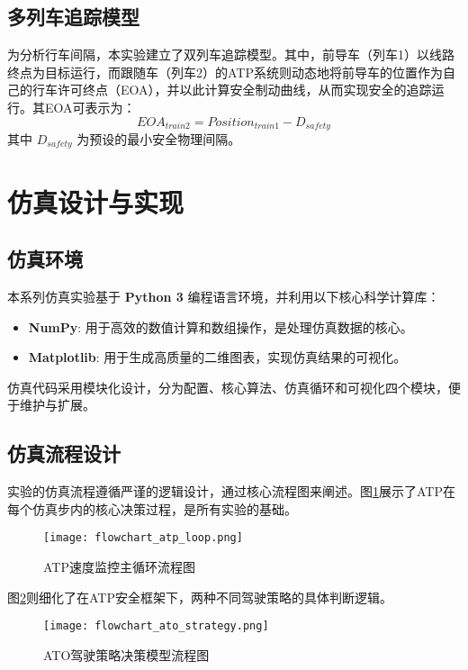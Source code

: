 \documentclass[11pt, a4paper]{ctexart}
\begin{document}
\subsection{多列车追踪模型}
为分析行车间隔，本实验建立了双列车追踪模型。其中，前导车（列车1）以线路终点为目标运行，而跟随车（列车2）的ATP系统则动态地将前导车的位置作为自己的行车许可终点（EOA），并以此计算安全制动曲线，从而实现安全的追踪运行。其EOA可表示为：
\begin{equation}
    EOA_{train2} = Position_{train1} - D_{safety}
\end{equation}
其中 $D_{safety}$ 为预设的最小安全物理间隔。

\section{仿真设计与实现}

\subsection{仿真环境}
本系列仿真实验基于 \textbf{Python 3} 编程语言环境，并利用以下核心科学计算库：
\begin{itemize}
    \item \textbf{NumPy}: 用于高效的数值计算和数组操作，是处理仿真数据的核心。
    \item \textbf{Matplotlib}: 用于生成高质量的二维图表，实现仿真结果的可视化。
\end{itemize}
仿真代码采用模块化设计，分为配置、核心算法、仿真循环和可视化四个模块，便于维护与扩展。

\subsection{仿真流程设计}
实验的仿真流程遵循严谨的逻辑设计，通过核心流程图来阐述。图\ref{fig:atp_loop}展示了ATP在每个仿真步内的核心决策过程，是所有实验的基础。

\begin{figure}[h!]
    \centering
    \texttt{[image: flowchart\_atp\_loop.png]}
    \caption{ATP速度监控主循环流程图}
    \label{fig:atp_loop}
\end{figure}

图\ref{fig:ato_strategy}则细化了在ATP安全框架下，两种不同驾驶策略的具体判断逻辑。

\begin{figure}[h!]
    \centering
    \texttt{[image: flowchart\_ato\_strategy.png]}
    \caption{ATO驾驶策略决策模型流程图}
    \label{fig:ato_strategy}
\end{figure}
\end{document}
